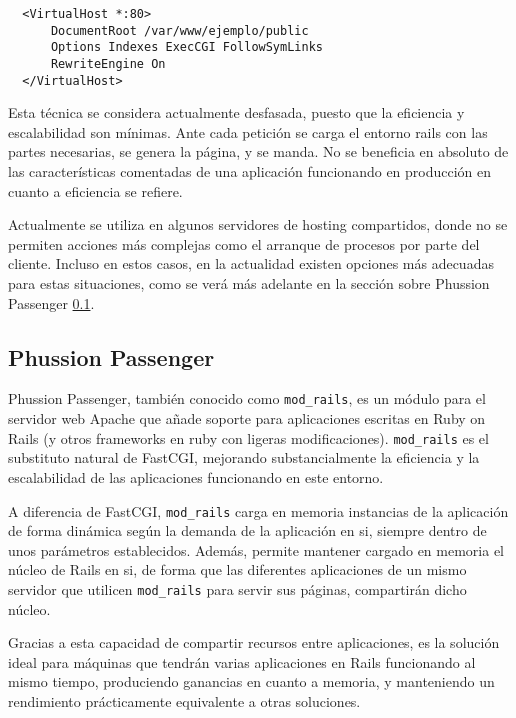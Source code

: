 \begin{verbatim}
  <VirtualHost *:80>
      DocumentRoot /var/www/ejemplo/public
      Options Indexes ExecCGI FollowSymLinks
      RewriteEngine On
  </VirtualHost>
\end{verbatim}

Esta técnica se considera actualmente desfasada, puesto que la eficiencia y escalabilidad son mínimas. Ante cada petición se carga el entorno rails con las partes necesarias, se genera la página, y se manda. No se beneficia en absoluto de las características comentadas de una aplicación funcionando en producción en cuanto a eficiencia se refiere.

Actualmente se utiliza en algunos servidores de hosting compartidos, donde no se permiten acciones más complejas como el arranque de procesos por parte del cliente. Incluso en estos casos, en la actualidad existen opciones más adecuadas para estas situaciones, como se verá más adelante en la sección sobre Phussion Passenger \ref{sub:phussion_passenger}.


\subsection{Phussion Passenger} %
\label{sub:phussion_passenger}

Phussion Passenger, también conocido como \texttt{mod\_rails}, es un módulo para el servidor web Apache que añade soporte para aplicaciones escritas en Ruby on Rails (y otros frameworks en ruby con ligeras modificaciones). \texttt{mod\_rails} es el substituto natural de FastCGI, mejorando substancialmente la eficiencia y la escalabilidad de las aplicaciones funcionando en este entorno.

A diferencia de FastCGI, \texttt{mod\_rails} carga en memoria instancias de la aplicación de forma dinámica según la demanda de la aplicación en si, siempre dentro de unos parámetros establecidos. Además, permite mantener cargado en memoria el núcleo de Rails en si, de forma que las diferentes aplicaciones de un mismo servidor que utilicen \texttt{mod\_rails} para servir sus páginas, compartirán dicho núcleo.

Gracias a esta capacidad de compartir recursos entre aplicaciones, es la solución ideal para máquinas que tendrán varias aplicaciones en Rails funcionando al mismo tiempo, produciendo ganancias en cuanto a memoria, y manteniendo un rendimiento prácticamente equivalente a otras soluciones.

